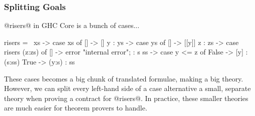 \documentclass[serif,professionalfont]{beamer}
\begin{document}
\begin{frame}[fragile]
  \frametitle{Splitting Goals}
  @risers@ in GHC Core is a bunch of cases...

  \begin{code}
  risers = \ xs -> case xs of {
      [] -> []
      y : ys -> case ys of {
          [] -> [[y]]
          z : zs -> case risers (z:zs) of {
              [] -> error "internal error";
              : s ss -> case y <= z of {
                  False -> [y] : (s:ss)
                  True ->  (y:s) : ss
      } } } }
  \end{code}

  These cases becomes a big chunk of translated formulae, making a big
  theory. However, we can split every left-hand side of a case
  alternative a small, separate theory when proving a contract for
  @risers@. In practice, these smaller theories are much easier for
  theorem provers to handle.

\end{frame}
\end{document}
